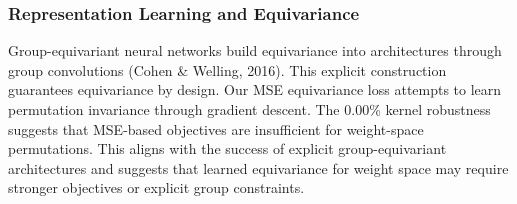 \subsubsection{Representation Learning and Equivariance}

Group-equivariant neural networks build equivariance into architectures through group convolutions (Cohen \& Welling, 2016). This explicit construction guarantees equivariance by design. Our MSE equivariance loss attempts to learn permutation invariance through gradient descent. The 0.00\% kernel robustness suggests that MSE-based objectives are insufficient for weight-space permutations. This aligns with the success of explicit group-equivariant architectures and suggests that learned equivariance for weight space may require stronger objectives or explicit group constraints.
